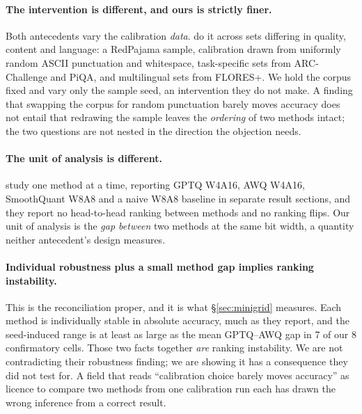\paragraph{The intervention is different, and ours is strictly finer.} Both
antecedents vary the calibration \emph{data}. \citet{paglieri2024outliers} do it
across sets differing in quality, content and language: a
RedPajama sample, calibration drawn from uniformly random ASCII punctuation and
whitespace, task-specific sets from ARC-Challenge and PiQA, and multilingual
sets from FLORES+. We hold the corpus fixed and vary only the sample seed, an
intervention they do not make. A finding that swapping the corpus for random
punctuation barely moves accuracy does not entail that redrawing the sample
leaves the \emph{ordering} of two methods intact; the two questions are not
nested in the direction the objection needs.

\paragraph{The unit of analysis is different.} \citet{paglieri2024outliers}
study one method at a time, reporting GPTQ W4A16, AWQ W4A16, SmoothQuant W8A8
and a naive W8A8 baseline in separate result sections, and they report no
head-to-head ranking between methods and no ranking flips. Our unit of analysis
is the \emph{gap between} two methods at the same bit width, a quantity neither
antecedent's design measures.

\paragraph{Individual robustness plus a small method gap implies ranking
instability.} This is the reconciliation proper, and it is what
\S\ref{sec:minigrid} measures. Each method is individually
stable in absolute accuracy, much as they report, and the seed-induced range is
at least as large as the mean GPTQ--AWQ gap in 7 of our 8 confirmatory cells.
Those two facts together \emph{are} ranking instability. We are not
contradicting their robustness finding; we are showing it has a consequence they
did not test for. A field that reads ``calibration choice barely moves accuracy''
as licence to compare two methods from one calibration run each has drawn the
wrong inference from a correct result.

